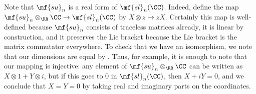 \documentclass[../notes.tex]{subfiles}
\begin{document}
\begin{example} \label{ex:su-real-form-sl}
	Note that $\mf{su}_n$ is a real form of $\mf{sl}_n(\CC)$. Indeed, define the map $\mf{su}_n\otimes_\RR\CC\to\mf{sl}_n(\CC)$ by $X\otimes z\mapsto zX$. Certainly this map is well-defined because $\mf{su}_n$ consists of traceless matrices already, it is linear by construction, and it preserves the Lie bracket because the Lie bracket is the matrix commutator everywhere. To check that we have an isomorphism, we note that our dimensions are equal by . Thus, for example, it is enough to note that our mapping is injective: any element of $\mf{su}_n\otimes_\RR\CC$ can be written as $X\otimes 1+Y\otimes i$, but if this goes to $0$ in $\mf{sl}_n(\CC)$, then $X+iY=0$, and we conclude that $X=Y=0$ by taking real and imaginary parts on the coordinates.
\end{example}
\end{document}

